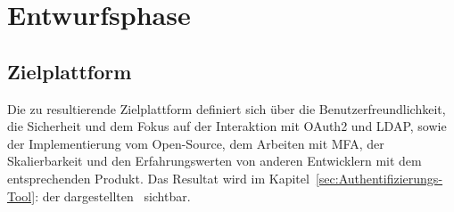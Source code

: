 \section{Entwurfsphase} 
\label{sec:Entwurfsphase}

\subsection{Zielplattform}
\label{sec:Zielplattform}
Die zu resultierende Zielplattform definiert sich über die Benutzerfreundlichkeit, die Sicherheit und dem Fokus auf der Interaktion 
mit OAuth2 und LDAP, sowie der Implementierung vom Open-Source, dem Arbeiten mit MFA, der Skalierbarkeit und den Erfahrungswerten von 
anderen Entwicklern mit dem entsprechenden Produkt. Das Resultat wird im Kapitel~\ref{sec:Authentifizierungs-Tool}: 
 der dargestellten~ sichtbar.


